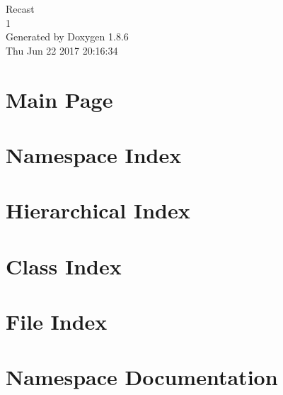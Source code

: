 \documentclass[twoside]{book}
\newcommand{\clearemptydoublepage}{%
  \newpage{\pagestyle{empty}\cleardoublepage}%
}
\begin{document}
\hypersetup{pageanchor=false}
\begin{titlepage}
\vspace*{7cm}
\begin{center}%
{\Large Recast \\[1ex]\large 1 }\\
\vspace*{1cm}
{\large Generated by Doxygen 1.8.6}\\
\vspace*{0.5cm}
{\small Thu Jun 22 2017 20:16:34}\\
\end{center}
\end{titlepage}
\clearemptydoublepage
\tableofcontents
\clearemptydoublepage
{}
\hypersetup{pageanchor=true}

\chapter{Main Page}
\label{index}\hypertarget{index}{}
\chapter{Namespace Index}

\chapter{Hierarchical Index}

\chapter{Class Index}

\chapter{File Index}

\chapter{Namespace Documentation}
























\end{document}
